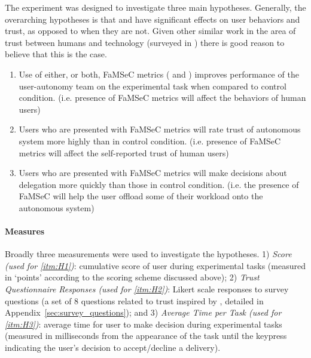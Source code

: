     The experiment was designed to investigate three main hypotheses. Generally, the overarching hypotheses is that \xQ{} and \xO{} have significant effects on user behaviors and trust, as opposed to when they are not. Given other similar work in the area of trust between humans and technology (surveyed in \cite{Israelsen2019-to}) there is good reason to believe that this is the case.

    \begin{enumerate}[label=\textbf{H\arabic*}]
        \item Use of either, or both, FaMSeC metrics (\xQ{} and \xO{}) improves performance of the user-autonomy team on the experimental task when compared to control condition. (i.e. presence of FaMSeC metrics will affect the behaviors of human users) \label{itm:H1}
        \item Users who are presented with FaMSeC metrics will rate trust of autonomous system more highly than in control condition. (i.e. presence of FaMSeC metrics will affect the self-reported trust of human users) \label{itm:H2}
        \item Users who are presented with FaMSeC metrics will make decisions about delegation more quickly than those in control condition. (i.e. the presence of FaMSeC will help the user offload some of their workload onto the autonomous system) \label{itm:H3}
    \end{enumerate}

    \noindent \paragraph{Measures}
    Broadly three measurements were used to investigate the hypotheses. 1) \emph{Score (used for \ref{itm:H1})}: cumulative score of user during experimental tasks (measured in `points' according to the scoring scheme discussed above); 2) \emph{Trust Questionnaire Responses (used for \ref{itm:H2})}: Likert scale responses to survey questions (a set of 8 questions related to trust inspired by \cite{Muir1996-gt}, detailed in Appendix~\ref{sec:survey_questions}); and 3) \emph{Average Time per Task (used for \ref{itm:H3})}: average time for user to make decision during experimental tasks (measured in milliseconds from the appearance of the task until the keypress indicating the user's decision to accept/decline a delivery).

